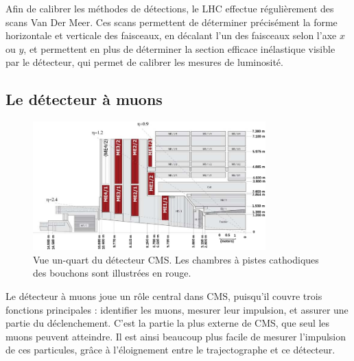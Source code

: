 Afin de calibrer les méthodes de détections, le LHC effectue régulièrement des scans Van Der Meer. Ces scans permettent de déterminer précisément la forme horizontale et verticale des faisceaux, en décalant l'un des faisceaux selon l'axe $x$ ou $y$, et permettent en plus de déterminer la section efficace inélastique \Pproton{}\Pproton{} visible par le détecteur, qui permet de calibrer les mesures de luminosité.

\subsection{Le détecteur à muons}

\begin{figure}[tb] \centering
  \includegraphics[width=0.8\textwidth]{chapitre2/figs/CSC.pdf}
  \caption{Vue un-quart du détecteur CMS. Les chambres à pistes cathodiques des bouchons sont illustrées en rouge.}
  \label{fig:cms_csc}
\end{figure}


Le détecteur à muons joue un rôle central dans CMS, puisqu'il couvre trois fonctions principales : identifier les muons, mesurer leur impulsion, et assurer une partie du déclenchement. C'est la partie la plus externe de CMS, que seul les muons peuvent atteindre. Il est ainsi beaucoup plus facile de mesurer l'impulsion de ces particules, grâce à l'éloignement entre le trajectographe et ce détecteur.

